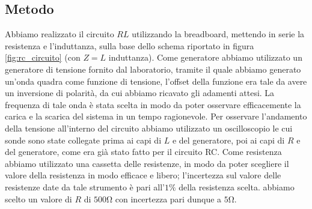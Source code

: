 \documentclass[a4paper]{article}
\begin{document}
\subsection{Metodo}
Abbiamo realizzato il circuito $RL$ utilizzando la breadboard, mettendo in serie la resistenza e l'induttanza, sulla base dello schema riportato in figura \ref{fig:rc_circuito} (con $Z = L$ induttanza).  Come generatore abbiamo utilizzato un generatore di tensione fornito dal laboratorio, tramite il quale abbiamo generato un'onda quadra come funzione di tensione, l'offset della funzione era tale da avere un inversione di polarità, da cui abbiamo ricavato gli adamenti attesi. La frequenza di tale onda è stata scelta in modo da poter osservare efficacemente la carica e la scarica del sistema in un tempo ragionevole. Per osservare l'andamento della  tensione all'interno del circuito abbiamo utilizzato un oscilloscopio le cui sonde sono state collegate prima ai capi di \( \mathit{L} \) e del generatore, poi ai capi di \( \mathit{R} \) e del generatore, come era già stato fatto per il circuito RC. Come resistenza abbiamo utilizzato una cassetta delle resistenze, in modo da poter scegliere il valore della resistenza in modo efficace e libero; l'incertezza sul valore delle resistenze date da tale strumento è pari all'\( \mathit{1\%} \) della resistenza scelta. abbiamo scelto un valore di $R$ di $500\si{\ohm}$ con incertezza pari dunque a $5\si{\ohm}$.

\end{document}

